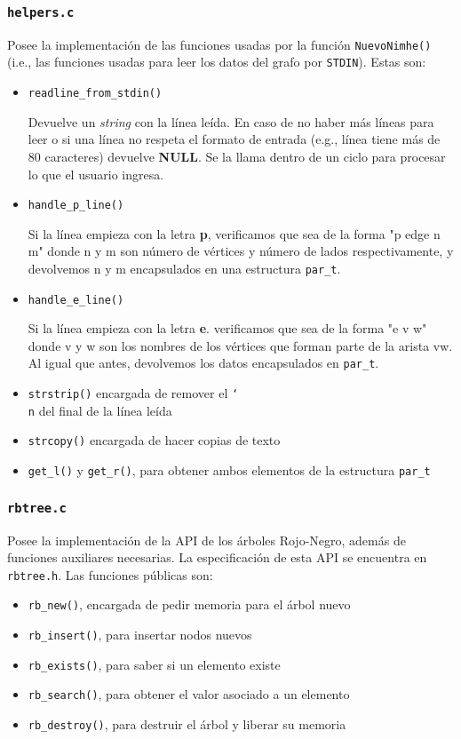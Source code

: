 \documentclass[11pt]{article}   	%
\begin{document}
\subsubsection{\texttt{helpers.c}}
Posee la implementación de las funciones usadas por la función \texttt{NuevoNimhe()} (i.e., las funciones
usadas para leer los datos del grafo por \texttt{STDIN}). Estas son:
\begin{itemize}
\item \texttt{readline\_from\_stdin()}

Devuelve un \emph{string} con la línea leída. En caso de no haber más líneas para leer o si una línea no
respeta el formato de entrada (e.g., línea tiene más de 80 caracteres)
devuelve \textbf{NULL}. Se la llama dentro de un ciclo para procesar lo que el usuario ingresa.
\item \texttt{handle\_p\_line()}

Si la línea empieza con la letra \textbf{p}, verificamos que sea de la forma "p edge n m" donde n y m
son número de vértices y número de lados respectivamente, y devolvemos n y m encapsulados en una estructura
\texttt{par\_t}.
\item \texttt{handle\_e\_line()}

Si la línea empieza con la letra \textbf{e}. verificamos que sea de la forma "e v w" donde v y w son los
nombres de los vértices que forman parte de la arista vw. Al igual que antes, devolvemos los datos
encapsulados en \texttt{par\_t}. 
\item \texttt{strstrip()} encargada de remover el \texttt{\char`\\n} del final de la línea leída
\item \texttt{strcopy()} encargada de hacer copias de texto
\item \texttt{get\_l()} y \texttt{get\_r()}, para obtener ambos elementos de la estructura \texttt{par\_t}
\end{itemize}

\subsubsection{\texttt{rbtree.c}}
Posee la implementación de la API de los árboles Rojo-Negro, además de funciones auxiliares necesarias.
La especificación de esta API se encuentra en \texttt{rbtree.h}.
Las funciones públicas son:

\begin{itemize}
\item \texttt{rb\_new()}, encargada de pedir memoria para el árbol nuevo
\item \texttt{rb\_insert()}, para insertar nodos nuevos
\item \texttt{rb\_exists()}, para saber si un elemento existe
\item \texttt{rb\_search()}, para obtener el valor asociado a un elemento
\item \texttt{rb\_destroy()}, para destruir el árbol y liberar su memoria
\end{itemize}
\end{document}
